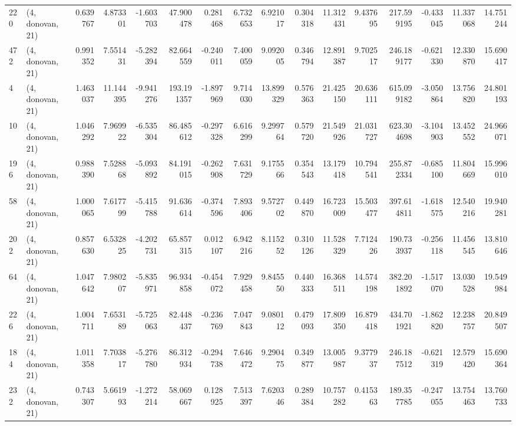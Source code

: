 \begin{tabular}{llrrrrrrrrrrrrrr}
220 &  (4, donovan, 21) &   0.639767 &   4.873301 &  -1.603703 &    47.900478 &   0.281468 &   6.732653 &   6.921017 &  0.304318 &  11.312431 &   9.437695 &   217.599195 &  -0.433045 &  11.337068 &  14.751244 \\
472 &  (4, donovan, 21) &   0.991352 &   7.551431 &  -5.282394 &    82.664559 &  -0.240011 &   7.400059 &   9.092005 &  0.346794 &  12.891387 &   9.702517 &   246.189177 &  -0.621330 &  12.330870 &  15.690417 \\
4   &  (4, donovan, 21) &   1.463037 &  11.144395 &  -9.941276 &   193.191357 &  -1.897969 &   9.714030 &  13.899329 &  0.576363 &  21.425150 &  20.636111 &   615.099182 &  -3.050864 &  13.756820 &  24.801193 \\
10  &  (4, donovan, 21) &   1.046292 &   7.969922 &  -6.535304 &    86.485612 &  -0.297328 &   6.616299 &   9.299764 &  0.579720 &  21.549926 &  21.031727 &   623.304698 &  -3.104903 &  13.452552 &  24.966071 \\
196 &  (4, donovan, 21) &   0.988390 &   7.528868 &  -5.093892 &    84.191015 &  -0.262908 &   7.631729 &   9.175566 &  0.354543 &  13.179418 &  10.794541 &   255.872334 &  -0.685100 &  11.804669 &  15.996010 \\
58  &  (4, donovan, 21) &   1.000065 &   7.617799 &  -5.415788 &    91.636614 &  -0.374596 &   7.893406 &   9.572702 &  0.449870 &  16.723009 &  15.503477 &   397.614811 &  -1.618575 &  12.540216 &  19.940281 \\
202 &  (4, donovan, 21) &   0.857630 &   6.532825 &  -4.202731 &    65.857315 &   0.012107 &   6.942216 &   8.115252 &  0.310126 &  11.528329 &   7.712426 &   190.733937 &  -0.256118 &  11.456545 &  13.810646 \\
64  &  (4, donovan, 21) &   1.047642 &   7.980207 &  -5.835971 &    96.934858 &  -0.454072 &   7.929458 &   9.845550 &  0.440333 &  16.368511 &  14.574198 &   382.201892 &  -1.517070 &  13.030528 &  19.549984 \\
226 &  (4, donovan, 21) &   1.004711 &   7.653189 &  -5.725063 &    82.448437 &  -0.236769 &   7.047843 &   9.080112 &  0.479093 &  17.809350 &  16.879418 &   434.701921 &  -1.862820 &  12.238757 &  20.849507 \\
184 &  (4, donovan, 21) &   1.011358 &   7.703817 &  -5.276780 &    86.312934 &  -0.294738 &   7.646472 &   9.290475 &  0.349877 &  13.005987 &   9.377937 &   246.187512 &  -0.621319 &  12.579420 &  15.690364 \\
232 &  (4, donovan, 21) &   0.743307 &   5.661993 &  -1.272214 &    58.069667 &   0.128925 &   7.513397 &   7.620346 &  0.289384 &  10.757282 &   0.415363 &   189.357785 &  -0.247055 &  13.754463 &  13.760733 \\

\end{tabular}
